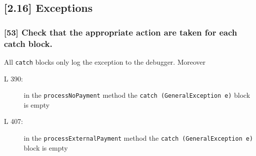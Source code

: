 \subsection*{[2.16] Exceptions}
\subsubsection*{[53] Check that the appropriate action are taken for each catch block.}
All {\tt catch} blocks only log the exception to the debugger. Moreover
\begin{description}
	\item[L 390:] in the {\tt processNoPayment} method the {\tt catch (GeneralException e)} block is empty
	\item[L 407:] in the {\tt processExternalPayment} method the \mbox{{\tt catch (GeneralException e)}} block is empty
\end{description}